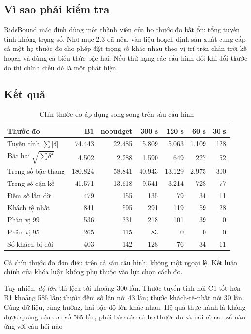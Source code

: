 \subsection{Vì sao phải kiểm tra}

RideBound mặc định dùng một thành viên của họ thước đo bất ổn: tổng tuyến tính không trọng số.
Như mục 2.3 đã nêu, văn liệu hoạch định sản xuất cung cấp cả một họ thước đo cho phép đặt trọng
số khác nhau theo vị trí trên chân trời kế hoạch và dùng cả biểu thức bậc hai. Nếu thứ hạng các
cấu hình đổi khi đổi thước đo thì chính điều đó là một phát hiện.

\subsection{Kết quả}

\begin{table}[htbp]
\centering
\caption{Chín thước đo áp dụng song song trên sáu cấu hình}
\label{bang:chinthuoc}
\footnotesize
\begin{tabular}{@{}lrrrrrr@{}}
\toprule
\textbf{Thước đo} & \textbf{B1} & \textbf{nobudget} & \textbf{300 s} & \textbf{120 s} & \textbf{60 s} & \textbf{30 s}\\
\midrule
Tuyến tính $\sum|\delta|$ & 74.443 & 22.485 & 15.809 & 5.063 & 1.109 & 128\\
Bậc hai $\sqrt{\sum \delta^2}$ & 4.502 & 2.288 & 1.590 & 649 & 227 & 52\\
Trọng số bậc thang & 180.824 & 58.841 & 40.943 & 13.129 & 2.975 & 300\\
Trọng số cận kề & 41.571 & 13.618 & 9.541 & 3.214 & 728 & 77\\
Đếm số lần dời & 479 & 155 & 135 & 79 & 34 & 11\\
Khách tệ nhất & 841 & 595 & 291 & 119 & 59 & 28\\
Phân vị 99 & 536 & 331 & 218 & 101 & 39 & 0\\
Phân vị 95 & 265 & 115 & 83 & 0 & 0 & 0\\
Số khách bị dời & 403 & 142 & 128 & 76 & 34 & 11\\
\bottomrule
\end{tabular}
\end{table}

Cả chín thước đo đơn điệu trên cả sáu cấu hình, không một ngoại lệ. Kết luận chính của khóa luận
không phụ thuộc vào lựa chọn cách đo.

Tuy nhiên, \emph{độ lớn} thì lệch tới khoảng 300 lần. Thước tuyến tính nói C1 tốt hơn B1 khoảng
585 lần; thước đếm số lần nói 43 lần; thước khách-tệ-nhất nói 30 lần. Cùng dữ liệu, cùng hướng,
hai bậc độ lớn khác nhau. Hệ quả thực hành là không được quảng cáo con số 585 lần; phải báo cáo
cả họ thước đo và nói rõ con số nào ứng với câu hỏi nào.

